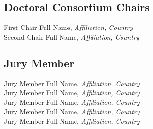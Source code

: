 
\subsection{Doctoral Consortium Chairs}
First Chair Full Name, \emph{Affiliation, Country}\\
Second Chair Full Name, \emph{Affiliation, Country}



\subsection{Jury Member}
Jury Member Full Name, \emph{Affiliation, Country}\\
Jury Member Full Name, \emph{Affiliation, Country}\\
Jury Member Full Name, \emph{Affiliation, Country}\\
Jury Member Full Name, \emph{Affiliation, Country}\\
Jury Member Full Name, \emph{Affiliation, Country}\\
